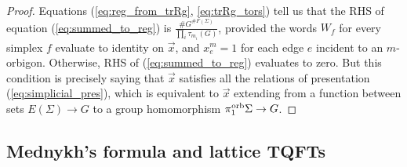 \documentclass{amsart}
\newcommand{\pio}{\pi_1^{\textnormal{orb}}}
\begin{document}
\begin{proof}
Equations (\ref{eq:reg_from_trRg}, \ref{eq:trRg_tors}) tell us that the RHS of equation (\ref{eq:summed_to_reg}) is $\tfrac{\#G^{\#F(\Sigma)}}{\prod_i\tau_{m_i}(G)}$, provided the words $W_f$ for every simplex $f$ evaluate to identity on $\vec{x}$, and $x_e^m=1$ for each edge $e$ incident to an $m$-orbigon. Otherwise, RHS of (\ref{eq:summed_to_reg}) evaluates to zero. But this condition is precisely saying that $\vec{x}$ satisfies all the relations of presentation (\ref{eq:simplicial_pres}), which is equivalent to $\vec{x}$ extending from a function between sets $E(\Sigma)\to G$ to a group homomorphism $\pio\Sigma\to G$.
\end{proof}

\subsection{Mednykh's formula and lattice TQFTs}\label{ssec:Mednykh}
\end{document}
